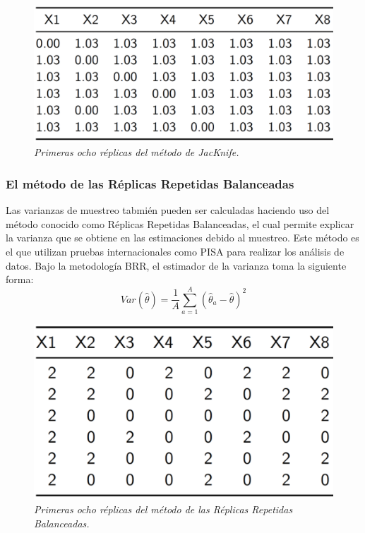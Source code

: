 \documentclass[
  12pt,
  spanish,
]{book}
\begin{document}
\begin{figure}
\centering
\includegraphics{Pics/20.png}
\caption{\emph{Primeras ocho réplicas del método de JacKnife.}}
\end{figure}

\hypertarget{el-muxe9todo-de-las-ruxe9plicas-repetidas-balanceadas}{%
\subsubsection*{El método de las Réplicas Repetidas Balanceadas}\label{el-muxe9todo-de-las-ruxe9plicas-repetidas-balanceadas}}

Las varianzas de muestreo tabmién pueden ser calculadas haciendo uso del método conocido como Réplicas Repetidas Balanceadas, el cual permite explicar la varianza que se obtiene en las estimaciones debido al muestreo. Este método es el que utilizan pruebas internacionales como PISA para realizar los análisis de datos. Bajo la metodología BRR, el estimador de la varianza toma la siguiente forma:
\[
Var(\hat{\theta}) = \frac{1}{A}\sum_{a=1}^A(\hat{\theta}_a - \hat\theta )^2
\]

\begin{figure}
\centering
\includegraphics{Pics/21.png}
\caption{\emph{Primeras ocho réplicas del método de las Réplicas Repetidas Balanceadas.}}
\end{figure}
\end{document}
